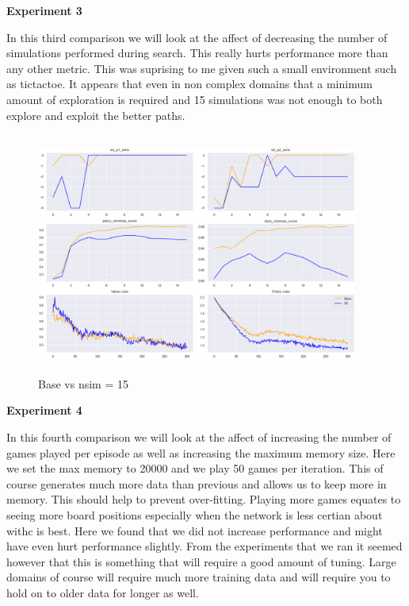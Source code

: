 \textbf{Experiment 3}

In this third comparison we will look at the affect of decreasing the number of simulations performed during search. This really hurts performance more than any other metric. This was suprising to me given such a small environment such as tictactoe. It appears that even in non complex domains that a minimum amount of exploration is required and 15 simulations was not enough to both explore and exploit the better paths.  

\begin{figure}[H]
       \centering
       \includegraphics[width=400px,height=300px]{experiments/base_vs_nsim=15.png}
       \caption{Base vs nsim = 15}
       \label{fig:my_label}
\end{figure}


\textbf{Experiment 4}

In this fourth comparison we will look at the affect of increasing the number of games played per episode as well as increasing the maximum memory size. Here we set the max memory to 20000 and we play 50 games per iteration. This of course generates much more data than previous and allows us to keep more in memory. This should help to prevent over-fitting. Playing more games equates to seeing more board positions especially when the network is less certian about withc is best. Here we found that we did not increase performance and might have even hurt performance slightly. From the experiments that we ran it seemed however that this is something that will require a good amount of tuning. Large domains of course will require much more training data and will require you to hold on to older data for longer as well. 

